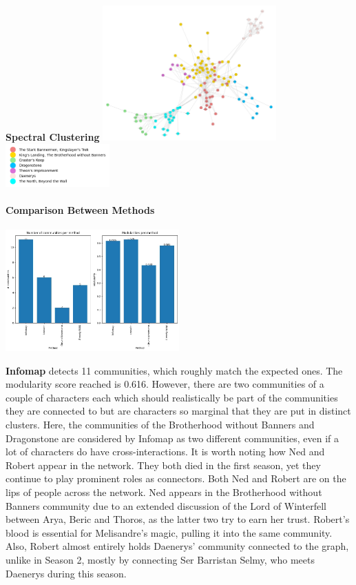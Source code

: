 \documentclass[10pt,twocolumn,letterpaper]{article}
\begin{document}
\begin{center}
    \textbf{Spectral Clustering}
    \includegraphics[width=0.5\textwidth]{img/s3/communities_sc.jpg}
    \includegraphics[width=0.3\textwidth]{img/s3/sc_legend.jpg}\\
    \caption{\small{$\#communities=$, $modularity=$}}
\end{center}

\paragraph{Comparison Between Methods}

\begin{center}
    \includegraphics[width=0.5\textwidth]{img/s3/communities_comparison.jpg}
\end{center}


\textbf{Infomap} detects 11 communities, which roughly match the expected ones. The modularity score reached is 0.616. However, there are two communities of a couple of characters each which should realistically be part of the communities they are connected to but are characters so marginal that they are put in distinct clusters. Here, the communities of the Brotherhood without Banners and Dragonstone are considered by Infomap as two different communities, even if a lot of characters do have cross-interactions. It is worth noting how Ned and Robert appear in the network. They both died in the first season, yet they continue to play prominent roles as connectors. Both Ned and Robert are on the lips of people across the network. Ned appears in the Brotherhood without Banners community due to an extended discussion of the Lord of Winterfell between Arya, Beric and Thoros, as the latter two try to earn her trust. Robert’s blood is essential for Melisandre’s magic, pulling it into the same community. Also, Robert almost entirely holds Daenerys' community connected to the graph, unlike in Season 2, mostly by connecting Ser Barristan Selmy, who meets Daenerys during this season.
\end{document}
